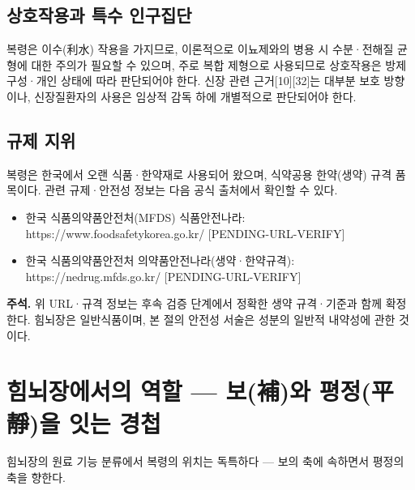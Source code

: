 \documentclass[11pt,oneside]{book}
\newenvironment{authnote}
  {\par\smallskip\begingroup\leftskip=7mm\rightskip=5mm\small\color{muted}\noindent\ignorespaces}
  {\par\endgroup\smallskip}
\begin{document}
\subsection{상호작용과 특수 인구집단}
복령은 이수(利水) 작용을 가지므로, 이론적으로 이뇨제와의 병용 시 수분·전해질 균형에 대한 주의가 필요할 수 있으며, 주로 복합 제형으로 사용되므로 상호작용은 방제 구성·개인 상태에 따라 판단되어야 한다. 신장 관련 근거[10][32]는 대부분 보호 방향이나, 신장질환자의 사용은 임상적 감독 하에 개별적으로 판단되어야 한다.

\subsection{규제 지위}
복령은 한국에서 오랜 식품·한약재로 사용되어 왔으며, 식약공용 한약(생약) 규격 품목이다. 관련 규제·안전성 정보는 다음 공식 출처에서 확인할 수 있다.

\begin{itemize}[leftmargin=6mm,itemsep=1pt,topsep=2pt]
  \item 한국 식품의약품안전처(MFDS) 식품안전나라: https://www.foodsafetykorea.go.kr/ [PENDING-URL-VERIFY]
  \item 한국 식품의약품안전처 의약품안전나라(생약·한약규격): https://nedrug.mfds.go.kr/ [PENDING-URL-VERIFY]
\end{itemize}
\begin{authnote}\textbf{주석.} 위 URL·규격 정보는 후속 검증 단계에서 정확한 생약 규격·기준과 함께 확정한다. 힘뇌장은 일반식품이며, 본 절의 안전성 서술은 성분의 일반적 내약성에 관한 것이다.\end{authnote}
\section{힘뇌장에서의 역할 — 보(補)와 평정(平靜)을 잇는 경첩}
힘뇌장의 원료 기능 분류에서 복령의 위치는 독특하다 — 보의 축에 속하면서 평정의 축을 향한다.

\vspace{2pt}\vspace{3pt}
\end{document}
